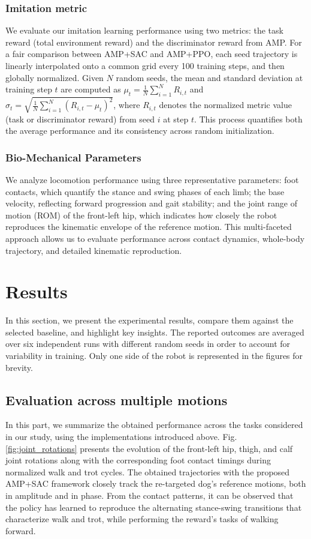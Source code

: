 \documentclass[letterpaper, 10pt, conference]{IEEEtran}
\begin{document}
\subsubsection{Imitation metric} We evaluate our imitation learning performance using two metrics: the task reward (total environment reward) and the discriminator reward from AMP. For a fair comparison between AMP+SAC and AMP+PPO, each seed trajectory is linearly interpolated onto a common grid every 100 training steps, and then globally normalized. Given $N$ random seeds, the mean and standard deviation at training step $t$ are computed as $\mu_{t}=\frac{1}{N}\sum_{i=1}^{N}R_{i,t}$ and $\sigma_{t}=\sqrt{\frac{1}{N}\sum_{i=1}^{N}(R_{i,t}-\mu_{t})^{2}}$, where $R_{i,t}$ denotes the normalized metric value (task or discriminator reward) from seed $i$ at step $t$. This process quantifies both the average performance and its consistency across random initialization.

\subsubsection{Bio-Mechanical Parameters} We analyze locomotion performance using three representative parameters: foot contacts, which quantify the stance and swing phases of each limb; the base velocity, reflecting forward progression and gait stability; and the joint range of motion (ROM) of the front-left hip, which indicates how closely the robot reproduces the kinematic envelope of the reference motion. This multi-faceted approach allows us to evaluate performance across contact dynamics, whole-body trajectory, and detailed kinematic reproduction.

\section{Results}

In this section, we present the experimental results, compare them against the selected baseline, and highlight key insights. The reported outcomes are averaged over six independent runs with different random seeds in order to account for variability in training. Only one side of the robot is represented in the figures for brevity.

\subsection{Evaluation across multiple motions}
In this part, we summarize the obtained performance across the tasks considered in our study, using the implementations introduced above. Fig. \ref{fig:joint_rotations} presents the evolution of the front-left hip, thigh, and calf joint rotations along with the corresponding foot contact timings during normalized walk and trot cycles. The obtained trajectories with the proposed AMP+SAC framework closely track the re-targeted dog's reference motions, both in amplitude and in phase. From the contact patterns, it can be observed that the policy has learned to reproduce the alternating stance-swing transitions that characterize walk and trot, while performing the reward's tasks of walking forward.
\end{document}
